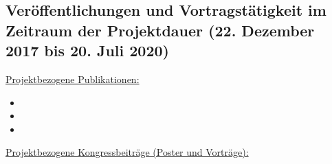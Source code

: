 \subsection*{Veröffentlichungen und Vortragstätigkeit im Zeitraum der Projektdauer (22. Dezember 2017 bis 20. Juli 2020)}
\label{cha:publications}

\underline{Projektbezogene Publikationen:}


\begin{itemize}
   
    \item 
    \item
    \item

\end{itemize}

\underline{Projektbezogene Kongressbeiträge (Poster und Vorträge):}

